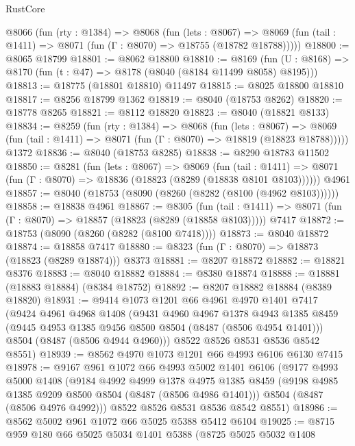 \begin{lexlean}{RustCore}
\begin{coremodule}
  @8066
    (fun (rty : @1384) =>
    @8068
      (fun (lets : @8067) =>
      @8069 (fun (tail : @1411) => @8071 (fun (Γ : @8070) => @18755 (@18782 @18788)))))
@18800 := @8065 @18799
@18801 := @8062 @18800
@18810 := @8169
    (fun (U : @8168) => @8170 (fun (t : @47) => @8178 (@8040 (@8184 @11499 @8058) @8195)))
@18813 := @18775 (@18801 @18810) @11497
@18815 := @8025 @18800 @18810
@18817 := @8256 @18799 @1362
@18819 := @8040 (@18753 @8262)
@18820 := @18778 @8265
@18821 := @8112 @18820
@18823 := @8040 (@18821 @8133)
@18834 := @8259
    (fun (rty : @1384) =>
    @8068
      (fun (lets : @8067) =>
      @8069 (fun (tail : @1411) => @8071 (fun (Γ : @8070) => @18819 (@18823 @18788)))))
    @1372
@18836 := @8040 (@18753 @8285)
@18838 := @8290 @18783 @11502
@18850 := @8281
    (fun (lets : @8067) =>
    @8069
      (fun (tail : @1411) =>
      @8071 (fun (Γ : @8070) => @18836 (@18823 (@8289 (@18838 @8101 @8103))))))
    @4961
@18857 := @8040 (@18753 (@8090 (@8260 (@8282 (@8100 (@4962 @8103))))))
@18858 := @18838 @4961
@18867 := @8305
    (fun (tail : @1411) => @8071 (fun (Γ : @8070) => @18857 (@18823 (@8289 (@18858 @8103)))))
    @7417
@18872 := @18753 (@8090 (@8260 (@8282 (@8100 @7418))))
@18873 := @8040 @18872
@18874 := @18858 @7417
@18880 := @8323 (fun (Γ : @8070) => @18873 (@18823 (@8289 @18874))) @8373
@18881 := @8207 @18872
@18882 := @18821 @8376
@18883 := @8040 @18882
@18884 := @8380 @18874
@18888 := @18881 (@18883 @18884) (@8384 @18752)
@18892 := @8207 @18882 @18884 (@8389 @18820)
@18931 := @9414
    @1073
    @1201
    @66
    @4961
    @4970
    @1401
    @7417
    (@9424
      @4961
      @4968
      @1408
      (@9431
        @4960
        @4967
        @1378
        @4943
        @1385
        @8459
        (@9445 @4953 @1385 @9456 @8500 @8504 (@8487 (@8506 @4954 @1401)))
        @8504
        (@8487 (@8506 @4944 @4960)))
      @8522
      @8526
      @8531
      @8536
      @8542
      @8551)
@18939 := @8562 @4970 @1073 @1201 @66 @4993 @6106 @6130 @7415
@18978 := @9167
    @961
    @1072
    @66
    @4993
    @5002
    @1401
    @6106
    (@9177
      @4993
      @5000
      @1408
      (@9184
        @4992
        @4999
        @1378
        @4975
        @1385
        @8459
        (@9198 @4985 @1385 @9209 @8500 @8504 (@8487 (@8506 @4986 @1401)))
        @8504
        (@8487 (@8506 @4976 @4992)))
      @8522
      @8526
      @8531
      @8536
      @8542
      @8551)
@18986 := @8562 @5002 @961 @1072 @66 @5025 @5388 @5412 @6104
@19025 := @8715
    @959
    @180
    @66
    @5025
    @5034
    @1401
    @5388
    (@8725
      @5025
      @5032
      @1408

\end{coremodule}
\end{lexlean}
